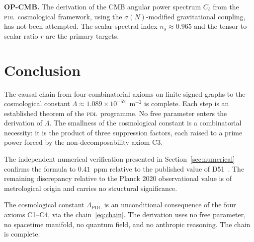 \documentclass[12pt,a4paper]{article}
\theoremstyle{plain}
\theoremstyle{definition}
\theoremstyle{remark}
\newenvironment{resolvedproblem}[1][]{%
  \begin{tcolorbox}[resolvedstyle, title={Resolved: #1}]}{\end{tcolorbox}}
\newcommand{\PDL}{\textsc{pdl}}
\newcommand{\Lam}{\Lambda}
\newcommand{\sigmaN}{\sigma(N)}
\begin{document}
\textbf{OP-CMB.} The derivation of the CMB angular power spectrum $C_\ell$ from the \PDL\ cosmological framework, using the $\sigmaN$-modified gravitational coupling, has not been attempted. The scalar spectral index $n_s \approx 0.965$ and the tensor-to-scalar ratio $r$ are the primary targets.

\section{Conclusion}
\label{sec:conclusion}

The causal chain from four combinatorial axioms on finite signed graphs to the cosmological constant $\Lambda \approx 1.089 \times 10^{-52}$~m$^{-2}$ is complete. Each step is an established theorem of the \PDL\ programme. No free parameter enters the derivation of $\Lambda$. The smallness of the cosmological constant is a combinatorial necessity: it is the product of three suppression factors, each raised to a prime power forced by the non-decomposability axiom C3.

The independent numerical verification presented in Section~\ref{sec:numerical} confirms the formula to $0.41$~ppm relative to the published value of D51~\cite{PDL_D51_2026}. The remaining discrepancy relative to the Planck 2020 observational value is of metrological origin and carries no structural significance.

\begin{resolvedproblem}[Causal closure C1--C4 to $\Lambda$]
The cosmological constant $\Lam_{\mathrm{PDL}}$ is an unconditional consequence of the four axioms C1--C4, via the chain~\eqref{eq:chain}. The derivation uses no free parameter, no spacetime manifold, no quantum field, and no anthropic reasoning. The chain is complete.
\end{resolvedproblem}

\clearpage


\end{document}
